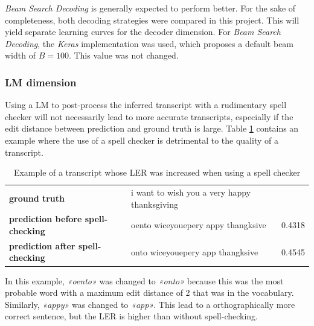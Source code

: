 \textit{Beam Search Decoding} is generally expected to perform better. For the sake of completeness, both decoding strategies were compared in this project. This will yield separate learning curves for the decoder dimension. For \textit{Beam Search Decoding}, the \textit{Keras} implementation was used, which proposes a default beam width of $B=100$. This value was not changed. 

\subsubsection{LM dimension}

Using a \ac{LM} to post-process the inferred transcript with a rudimentary spell checker will not necessarily lead to more accurate transcripts, especially if the edit distance between prediction and ground truth is large. Table \ref{lm_bad_example} contains an example where the use of a spell checker is detrimental to the quality of a transcript.

\begin{table}[!htbp]
	\centering
	\begin{tabular}{llr}
		\toprule
		 &  & \thead{\ac{LER}} \\
		\midrule
		\textbf{ground truth} & i want to wish you a very happy thanksgiving & \\ 
		\textbf{prediction before spell-checking} & oento wiceyouepery appy thangksive & 0.4318 \\ 
		\textbf{prediction after spell-checking} & onto wiceyouepery app thangksive & 0.4545 \\ 		
		\bottomrule
	\end{tabular}
	\caption{Example of a transcript whose \ac{LER} was increased when using a spell checker}
	\label{lm_bad_example}
\end{table}



In this example, \textit{«oento»} was changed to \textit{«onto»} because this was the most probable word with a maximum edit distance of 2 that was in the vocabulary. Similarly, \textit{«appy»} was changed to \textit{«app»}. This lead to a orthographically more correct sentence, but the \ac{LER} is higher than without spell-checking. 


